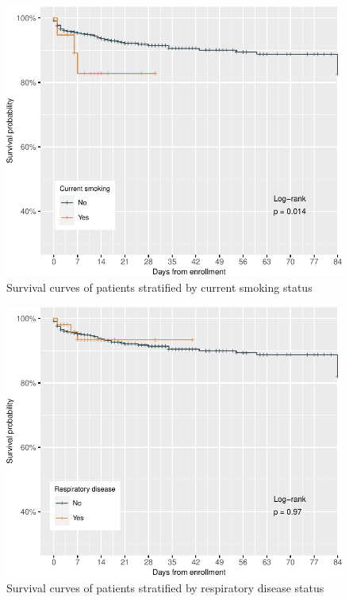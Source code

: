 \documentclass[
  10pt,
]{article}
\begin{document}
\newpage
\begin{figure}[h]

{\centering \includegraphics{results_files/figure-latex/smoking-1} 

}

\caption{Survival curves of patients stratified by current smoking status}\label{fig:smoking}
\end{figure}

\newpage
\begin{figure}[h]

{\centering \includegraphics{results_files/figure-latex/respiratory-disease-1} 

}

\caption{Survival curves of patients stratified by respiratory disease status}\label{fig:respiratory-disease}
\end{figure}
\end{document}
